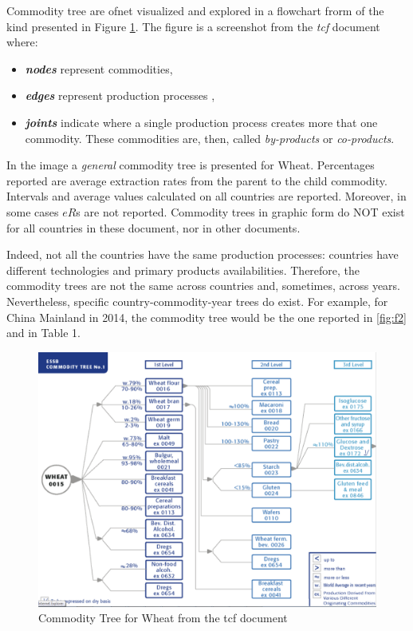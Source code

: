 \documentclass[]{article}
\providecommand{\tightlist}{%
  \setlength{\itemsep}{0pt}\setlength{\parskip}{0pt}}
\begin{document}
Commodity tree are ofnet visualized and explored in a flowchart frorm of
the kind presented in Figure \ref{fig:f1}. The figure is a screenshot
from the \emph{tcf} document where:

\begin{itemize}
\tightlist
\item
  \textbf{\emph{nodes}} represent commodities,
\item
  \textbf{\emph{edges}} represent production processes ,
\item
  \textbf{\emph{joints}} indicate where a single production process
  creates more that one commodity. These commodities are, then, called
  \emph{by-products} or \emph{co-products}.
\end{itemize}

In the image a \emph{general} commodity tree is presented for Wheat.
Percentages reported are average extraction rates from the parent to the
child commodity. Intervals and average values calculated on all
countries are reported. Moreover, in some cases \(eR\)s are not
reported. Commodity trees in graphic form do NOT exist for all countries
in these document, nor in other documents.

Indeed, not all the countries have the same production processes:
countries have different technologies and primary products
availabilities. Therefore, the commodity trees are not the same across
countries and, sometimes, across years. Nevertheless, specific
country-commodity-year trees do exist. For example, for China Mainland
in 2014, the commodity tree would be the one reported in \ref{fig:f2}
and in Table 1.

\begin{figure}[H]

{\centering \includegraphics[width=1\linewidth]{images/commodityTree/01_tcfWheat} 

}

\caption{\label{fig:f1}Commodity Tree for Wheat from the tcf document}\label{fig:f1}
\end{figure}
\end{document}
